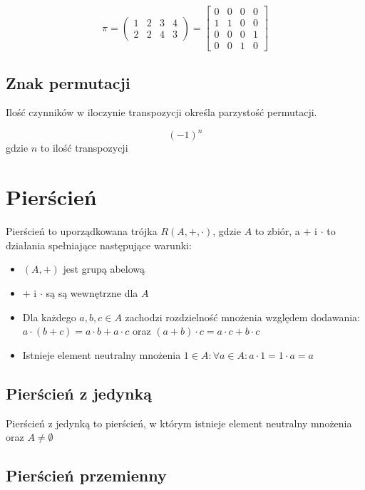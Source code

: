 \documentclass{../notatki}
\begin{document}
$$
\pi =
\begin{pmatrix}
  1 & 2 & 3 & 4\\
  2 & 2 & 4 & 3
\end{pmatrix}
=
\begin{bmatrix}
  0 & 0 & 0 & 0\\
  1 & 1 & 0 & 0\\
  0 & 0 & 0 & 1\\
  0 & 0 & 1 & 0
\end{bmatrix}
$$

\subsection{Znak permutacji}

Ilość czynników w iloczynie transpozycji określa parzystość permutacji.

$$(-1)^n$$ gdzie $n$ to ilość transpozycji

\section{Pierścień}

Pierścień to uporządkowana trójka $R(A, +, \cdot)$, gdzie $A$ to
zbiór, a $+$ i $\cdot$ to działania spełniające następujące warunki:

\begin{itemize}
  \item $(A, +)$ jest grupą abelową
  \item $+$ i $\cdot$ są są wewnętrzne dla $A$
  \item Dla każdego $a, b, c \in A$ zachodzi rozdzielność mnożenia
    względem dodawania: $a \cdot (b + c) = a \cdot b + a \cdot c$
    oraz $(a + b) \cdot c = a \cdot c + b \cdot c$
  \item Istnieje element neutralny mnożenia $1 \in A: \forall a \in
    A: a \cdot 1 = 1 \cdot a = a$
\end{itemize}

\subsection{Pierścień z jedynką}

Pierścień z jedynką to pierścień, w którym istnieje element neutralny
mnożenia oraz $A \ne \emptyset$

\subsection{Pierścień przemienny}
\end{document}
